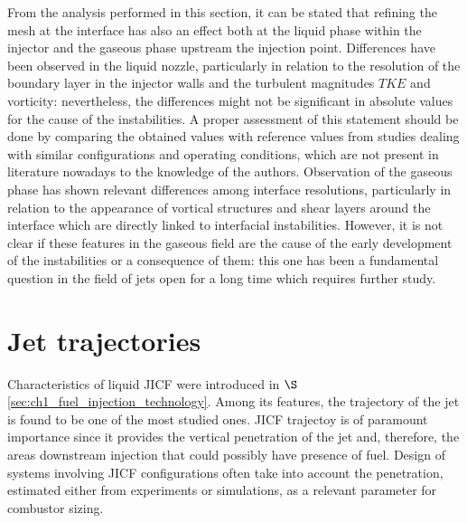 From the analysis performed in this section, it can be stated that refining the mesh at the interface has also an effect both at the liquid phase within the injector and the gaseous phase upstream the injection point. Differences have been observed in the liquid nozzle, particularly in relation to the resolution of the boundary layer in the injector walls and the turbulent magnitudes $TKE$ and vorticity: nevertheless, the differences might not be significant in absolute values for the cause of the instabilities. A proper assessment of this statement should be done by comparing the obtained values with reference values from studies dealing with similar configurations and operating conditions, which are not present in literature nowadays to the knowledge of the authors. Observation of the gaseous phase has shown relevant differences among interface resolutions, particularly in relation to the appearance of vortical structures and shear layers around the interface which are directly linked to interfacial instabilities. However, it is not clear if these features in the gaseous field are the cause of the early development of the instabilities or a consequence of them: this one has been a fundamental question in the field of jets open for a long time  which requires further study. %










\section{Jet trajectories}
\label{subsec:ch5_jet_trajectories_results}

Characteristics of liquid JICF were introduced in $\S$\ref{sec:ch1_fuel_injection_technology}. Among its features, the trajectory of the jet is found to be one of the most studied ones. JICF trajectoy is of paramount importance since it provides the vertical penetration of the jet and, therefore, the areas downstream injection that could possibly have presence of fuel. Design of systems involving JICF configurations often take into account the penetration, estimated either from experiments or simulations, as a relevant parameter for combustor sizing.


